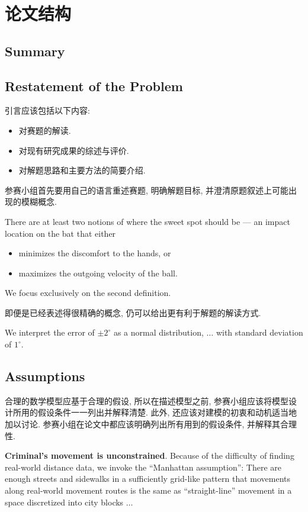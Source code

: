 \documentclass[openany]{ctexbook}
\newenvironment{example}{\begin{tcolorbox}[title=Example]}{\end{tcolorbox}}
\begin{document}
\tableofcontents\clearpage


\chapter{论文结构}
    \section*{Summary}
    \lipsum[1] %

    \section{Restatement of the Problem}
    引言应该包括以下内容:
    \begin{itemize}
    	\item 对赛题的解读.
    	\item 对现有研究成果的综述与评价.
    	\item 对解题思路和主要方法的简要介绍.
    \end{itemize}
    参赛小组首先要用自己的语言重述赛题, 明确解题目标, 并澄清原题叙述上可能出现的模糊概念.
    \begin{example}
        There are at least two notions of where the sweet spot should be --- an impact location on the bat that either
        \begin{itemize}
        	\item minimizes the discomfort to the hands, or
        	\item maximizes the outgoing velocity of the ball.
        \end{itemize}
        We focus exclusively on the second definition.
    \end{example}
    即便是已经表述得很精确的概念, 仍可以给出更有利于解题的解读方式.
    \begin{example}
        We interpret the error of $\pm 2^\circ$ as a normal distribution, $\ldots$ with standard deviation of $1^\circ$.
    \end{example}


    \section{Assumptions}
    合理的数学模型应基于合理的假设, 所以在描述模型之前, 参赛小组应该将模型设计所用的假设条件一一列出并解释清楚. 此外, 还应该对建模的初衷和动机适当地加以讨论. 参赛小组在论文中都应该明确列出所有用到的假设条件, 并解释其合理性.
    \begin{example}
        \textbf{Criminal's movement is unconstrained}. Because of the difficulty of finding real-world distance data, we invoke the ``Manhattan assumption'': There are enough streets and sidewalks in a sufficiently grid-like pattern that movements along real-world movement routes is the same as ``straight-line'' movement in a space discretized into city blocks $\ldots$
    \end{example}
\end{document}
